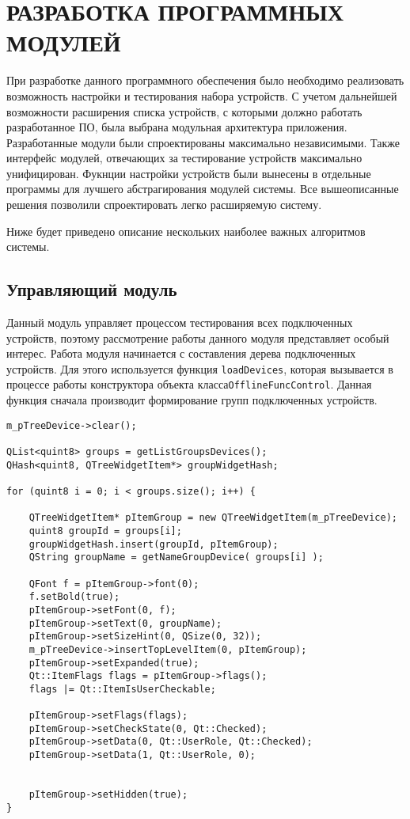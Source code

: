 \section{РАЗРАБОТКА ПРОГРАММНЫХ МОДУЛЕЙ}
\label{sec:modules}

При разработке данного программного обеспечения было необходимо реализовать возможность настройки и тестирования
набора устройств. С учетом дальнейшей возможности расширения списка устройств, с которыми должно работать разработанное
ПО, была выбрана модульная архитектура приложения. Разработанные модули были спроектированы максимально независимыми.
Также интерфейс модулей, отвечающих за тестирование устройств максимально унифицирован. Фукнции настройки устройств были
вынесены в отдельные программы для лучшего абстрагирования модулей системы. Все вышеописанные решения
позволили спроектировать легко расширяемую систему.

Ниже будет приведено описание нескольких наиболее важных алгоритмов системы.

\subsection{Управляющий модуль}
Данный модуль управляет процессом тестирования всех подключенных устройств, поэтому рассмотрение работы данного модуля
представляет особый интерес.
Работа модуля начинается с составления дерева подключенных устройств. Для этого используется функция
\texttt{loadDevices}, которая вызывается в процессе работы конструктора объекта класса\break \texttt{OfflineFuncControl}.
Данная функция сначала производит формирование групп подключенных устройств.

\medskip
\begin{verbatim}
m_pTreeDevice->clear();

QList<quint8> groups = getListGroupsDevices();
QHash<quint8, QTreeWidgetItem*> groupWidgetHash;

for (quint8 i = 0; i < groups.size(); i++) {

	QTreeWidgetItem* pItemGroup = new QTreeWidgetItem(m_pTreeDevice);
	quint8 groupId = groups[i];
	groupWidgetHash.insert(groupId, pItemGroup);
	QString groupName = getNameGroupDevice( groups[i] );

	QFont f = pItemGroup->font(0);
	f.setBold(true);
	pItemGroup->setFont(0, f);
	pItemGroup->setText(0, groupName);
	pItemGroup->setSizeHint(0, QSize(0, 32));
	m_pTreeDevice->insertTopLevelItem(0, pItemGroup);
	pItemGroup->setExpanded(true);
	Qt::ItemFlags flags = pItemGroup->flags();
	flags |= Qt::ItemIsUserCheckable;

	pItemGroup->setFlags(flags);
	pItemGroup->setCheckState(0, Qt::Checked);
	pItemGroup->setData(0, Qt::UserRole, Qt::Checked);
	pItemGroup->setData(1, Qt::UserRole, 0);


	pItemGroup->setHidden(true);
}
\end{verbatim}
\medskip

